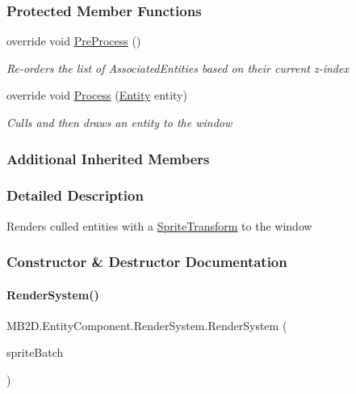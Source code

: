 \subsubsection*{Protected Member Functions}
\begin{DoxyCompactItemize}
\item 
override void \hyperlink{class_m_b2_d_1_1_entity_component_1_1_render_system_aadd36efe73a5f8cc489894232a5fc201}{Pre\+Process} ()
\begin{DoxyCompactList}\small\item\em Re-\/orders the list of Associated\+Entities based on their current z-\/index \end{DoxyCompactList}\item 
override void \hyperlink{class_m_b2_d_1_1_entity_component_1_1_render_system_a015ba5b16cc227c7a5a16fcc1ffa73b7}{Process} (\hyperlink{class_m_b2_d_1_1_entity_component_1_1_entity}{Entity} entity)
\begin{DoxyCompactList}\small\item\em Culls and then draws an entity to the window \end{DoxyCompactList}\end{DoxyCompactItemize}
\subsubsection*{Additional Inherited Members}


\subsubsection{Detailed Description}
Renders culled entities with a \hyperlink{class_m_b2_d_1_1_entity_component_1_1_sprite_transform}{Sprite\+Transform} to the window 



\subsubsection{Constructor \& Destructor Documentation}
\hypertarget{class_m_b2_d_1_1_entity_component_1_1_render_system_a3f09291aad8620444cc5248def8431b2}{}\label{class_m_b2_d_1_1_entity_component_1_1_render_system_a3f09291aad8620444cc5248def8431b2} 
\paragraph{\texorpdfstring{Render\+System()}{RenderSystem()}}
{\footnotesize\ttfamily M\+B2\+D.\+Entity\+Component.\+Render\+System.\+Render\+System (\begin{DoxyParamCaption}\item[{Sprite\+Batch}]{sprite\+Batch }\end{DoxyParamCaption})\hspace{0.3cm}{\ttfamily [inline]}}



